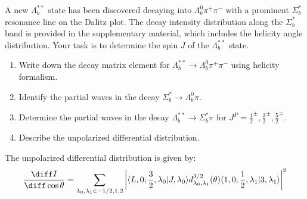 A new \(\Lambda_b^{**}\) state has been discovered decaying into \(\Lambda_b^0 \pi^+ \pi^-\) with a prominent \(\Sigma_b^*\) resonance line on the Dalitz plot. The decay intensity distribution along the \(\Sigma_b^*\) band is provided in the supplementary material, which includes the helicity angle distribution. Your task is to determine the spin \(J\) of the \(\Lambda_b^{**}\) state.

\begin{enumerate}
    \item Write down the decay matrix element for \(\Lambda_b^{**} \to \Lambda_b^0 \pi^+ \pi^-\) using helicity formalism.
    \item Identify the partial waves in the decay \(\Sigma_b^* \to \Lambda_b^0 \pi\).
    \item Determine the partial waves in the decay \(\Lambda_b^{**} \to \Sigma_b^* \pi\) for \(J^P = \frac{1}{2}^\pm, \frac{3}{2}^\pm, \frac{5}{2}^\pm\).
    \item Describe the unpolarized differential distribution.
\end{enumerate}

The unpolarized differential distribution is given by:
$$
    \frac{\diff I}{\diff \cos \theta} = \sum_{\lambda_0, \lambda_1 \in {-1/2,1,2}} \left| \langle L, 0; \frac{3}{2}, \lambda_0 | J, \lambda_0 \rangle d^{3/2}_{\lambda_0, \lambda_1}(\theta) \langle 1, 0; \frac{1}{2}, \lambda_1 | 3, \lambda_1 \rangle \right|^2
$$